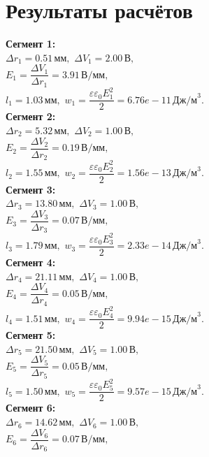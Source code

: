\documentclass{article}
\begin{document}
\section*{Результаты расчётов}
\noindent \textbf{Сегмент 1:}\\
$\Delta r_{1} = 0.51\,\text{мм},$ $\Delta V_{1} = 2.00\,\text{В},$\\
$E_{1} = \dfrac{\Delta V_{1}}{\Delta r_{1}} = 3.91\,\text{В/мм},$\\
$l_{1} = 1.03\,\text{мм},$ $w_{1} = \dfrac{\varepsilon \varepsilon_0 E_{1}^2}2 = 6.76e-11\,\text{Дж/м}^3.$\\[1em]
\noindent \textbf{Сегмент 2:}\\
$\Delta r_{2} = 5.32\,\text{мм},$ $\Delta V_{2} = 1.00\,\text{В},$\\
$E_{2} = \dfrac{\Delta V_{2}}{\Delta r_{2}} = 0.19\,\text{В/мм},$\\
$l_{2} = 1.55\,\text{мм},$ $w_{2} = \dfrac{\varepsilon \varepsilon_0 E_{2}^2}2 = 1.56e-13\,\text{Дж/м}^3.$\\[1em]
\noindent \textbf{Сегмент 3:}\\
$\Delta r_{3} = 13.80\,\text{мм},$ $\Delta V_{3} = 1.00\,\text{В},$\\
$E_{3} = \dfrac{\Delta V_{3}}{\Delta r_{3}} = 0.07\,\text{В/мм},$\\
$l_{3} = 1.79\,\text{мм},$ $w_{3} = \dfrac{\varepsilon \varepsilon_0 E_{3}^2}2 = 2.33e-14\,\text{Дж/м}^3.$\\[1em]
\noindent \textbf{Сегмент 4:}\\
$\Delta r_{4} = 21.11\,\text{мм},$ $\Delta V_{4} = 1.00\,\text{В},$\\
$E_{4} = \dfrac{\Delta V_{4}}{\Delta r_{4}} = 0.05\,\text{В/мм},$\\
$l_{4} = 1.51\,\text{мм},$ $w_{4} = \dfrac{\varepsilon \varepsilon_0 E_{4}^2}2 = 9.94e-15\,\text{Дж/м}^3.$\\[1em]
\noindent \textbf{Сегмент 5:}\\
$\Delta r_{5} = 21.50\,\text{мм},$ $\Delta V_{5} = 1.00\,\text{В},$\\
$E_{5} = \dfrac{\Delta V_{5}}{\Delta r_{5}} = 0.05\,\text{В/мм},$\\
$l_{5} = 1.50\,\text{мм},$ $w_{5} = \dfrac{\varepsilon \varepsilon_0 E_{5}^2}2 = 9.57e-15\,\text{Дж/м}^3.$\\[1em]
\noindent \textbf{Сегмент 6:}\\
$\Delta r_{6} = 14.62\,\text{мм},$ $\Delta V_{6} = 1.00\,\text{В},$\\
$E_{6} = \dfrac{\Delta V_{6}}{\Delta r_{6}} = 0.07\,\text{В/мм},$\\
\end{document}
